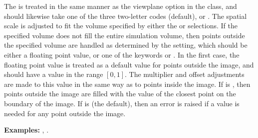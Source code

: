 \begin{description}
The  is treated in the same manner as the viewplane
option in the  class, and should
likewise take one of the three two-letter codes  (default),
 or .  The spatial scale is adjusted to fit the volume
specified by either the  or
 selections.  If the specified volume
does not fill the entire simulation volume, then points outside the
specified volume are handled as determined by the 
setting, which should be either a floating point value, or one of the
keywords  or .  In the first case, the floating
point value is treated as a default value for points outside the image,
and should have a value in the range $[0,1]$.  The multiplier and offset
adjustments are made to this value in the same way as to points inside
the image.  If  is , then points outside the
image are filled with the value of the closest point on the boundary of
the image.  If  is  (the default), then an error
is raised if a value is needed for any point outside the image.

\textbf{Examples:} , .

\end{description}

